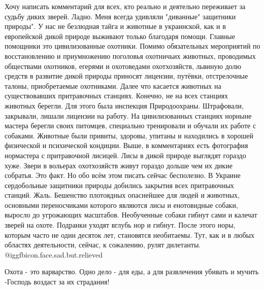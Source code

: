 \begin{itemize}
\begin{itemize}
\end{itemize} %


Хочу написать комментарий для всех, кто реально и деятельно переживает за
судьбу диких зверей. Ладно. Меня всегда удивляли "диванные" защитники природы".
У нас не безлюдная тайга и животные в украинской, как и в европейской дикой
природе выживают только благодаря помощи. Главные помощники это цивилизованные
охотники. Помимо обязательных мероприятий по восстановлению и приумножению
поголовья охотничьих животных, проводимых обществами охотников, егерями и
охотоведами охотхозяйств, львиную долю средств в развитие дикой природы
приносят лицензии, путёвки, отстрелочные талоны, приобретаемые охотниками.
Далее что касается животных на существовавших притравочных станциях. Конечно,
не на всех станциях животных берегли. Для этого была инспекция Природоохраны.
Штрафовали, закрывали, лишали лицензии на работу. На цивилизованных станциях
норныне мастера берегли своих питомцев, специально тренировали и обучали их
работе с собаками. Животные были привиты, здоровы, упитаны и находились в
хорошей физической и психической кондиции. Выше, в комментариях есть фотография
нормастера с притравочной лисицей. Лисы в дикой природе выглядят гораздо хуже.
Звери в вольерах охотхозяйств живут гораздо дольше чем их дикие собратья. Это
факт. Но обо всём этом писать сейчас бесполезно. В Украине сердобольные
защитники природы добились закрытия всех притравочных станций. Жаль. Бешенство
плотоядных опаснейшее для людей и животных, основными переносчиками которого
являются лисы и енотовидные собаки, выросло до угрожающих масштабов.
Необученные собаки гибнут сами и калечат зверей на охоте. Подранки уходят
вглубь нор и гибнут. После этого норы, которым часто не один десяток лет,
становятся необитаемы. Тут, как и в любых областях деятельности, сейчас, к
сожалению, рулят дилетанты. @igg{fbicon.face.sad.but.relieved} 


Охота - это варварство. Одно дело - для еды, а для развлечения убивать и мучить
-Господь воздаст за их страдания!

\end{itemize} %
